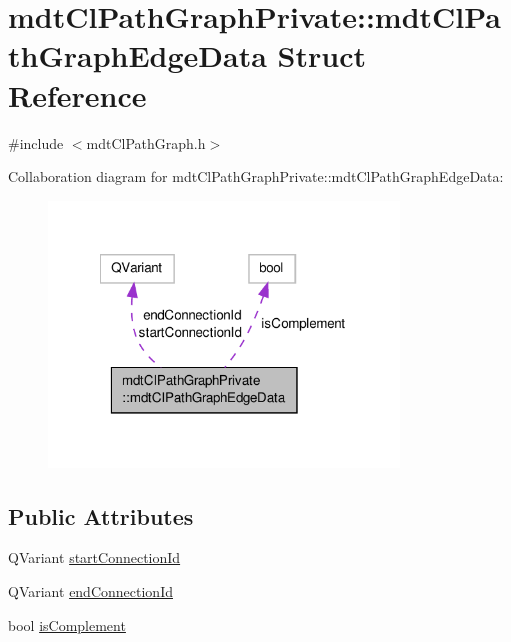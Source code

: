 \hypertarget{structmdt_cl_path_graph_private_1_1mdt_cl_path_graph_edge_data}{\section{mdt\-Cl\-Path\-Graph\-Private\-:\-:mdt\-Cl\-Path\-Graph\-Edge\-Data Struct Reference}
\label{structmdt_cl_path_graph_private_1_1mdt_cl_path_graph_edge_data}
}


{\ttfamily \#include $<$mdt\-Cl\-Path\-Graph.\-h$>$}



Collaboration diagram for mdt\-Cl\-Path\-Graph\-Private\-:\-:mdt\-Cl\-Path\-Graph\-Edge\-Data\-:\nopagebreak
\begin{figure}[H]
\begin{center}
\leavevmode
\includegraphics[width=264pt]{structmdt_cl_path_graph_private_1_1mdt_cl_path_graph_edge_data__coll__graph}
\end{center}
\end{figure}
\subsection*{Public Attributes}
\begin{DoxyCompactItemize}
\item 
Q\-Variant \hyperlink{structmdt_cl_path_graph_private_1_1mdt_cl_path_graph_edge_data_a4d17d73e0bbc09b541b91a9ca1cad8da}{start\-Connection\-Id}
\item 
Q\-Variant \hyperlink{structmdt_cl_path_graph_private_1_1mdt_cl_path_graph_edge_data_a6dfdd2c68bdec4556ab367517737b7a1}{end\-Connection\-Id}
\item 
bool \hyperlink{structmdt_cl_path_graph_private_1_1mdt_cl_path_graph_edge_data_a423302ffa14fedbb80f362f9f44960d7}{is\-Complement}
\end{DoxyCompactItemize}


